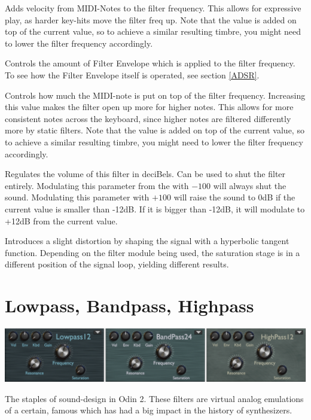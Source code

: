 {Adds velocity from MIDI-Notes to the filter frequency. This allows for expressive play, as harder key-hits move the filter freq up. Note that the value is added on top of the current value, so to achieve a similar resulting timbre, you might need to lower the filter frequency accordingly.}

{Controls the amount of Filter Envelope which is applied to the filter frequency. To see how the Filter Envelope itself is operated, see section \ref{ADSR}.}

{Controls how much the MIDI-note is put on top of the filter frequency. Increasing this value makes the filter open up more for higher notes. This allows for more consistent notes across the keyboard, since higher notes are filtered differently more by static filters. Note that the value is added on top of the current value, so to achieve a similar resulting timbre, you might need to lower the filter frequency accordingly.}

{Regulates the volume of this filter in deciBels. Can be used to shut the filter entirely. Modulating this parameter from the \modmatrix  with $-100$ will always shut the sound. Modulating this parameter with $+100$ will raise the sound to 0dB if the current value is smaller than -12dB. If it is bigger than -12dB, it will modulate to +12dB from the current value.}

{Introduces a slight distortion by shaping the signal with a hyperbolic tangent function. Depending on the filter module being used, the saturation stage is in a different position of the signal loop, yielding different results.}

\section{Lowpass, Bandpass, Highpass}
\begin{center}
    \includegraphics[width=\textwidth]{graphics/lp_bp_hp.png}
\end{center}

The staples of sound-design in Odin 2. These filters are virtual analog emulations of a certain, famous  which has had a big impact in the history of synthesizers.

